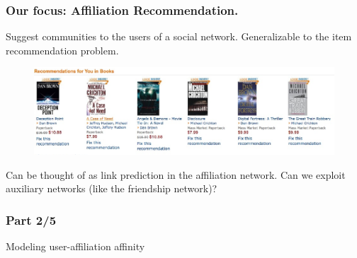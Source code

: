 \documentclass{beamer}
\begin{document}
\begin{frame}
\frametitle{Our focus: Affiliation Recommendation.}
\begin{itemize}
\pitem Suggest communities to the users of a social network.
\pitem Generalizable to the item recommendation problem.
\begin{figure}
\includegraphics[scale=0.25]{../talk/figures/amazonRecommendations.eps}
\end{figure}
\pitem Can be thought of as link prediction in the affiliation network.
\pitem Can we exploit auxiliary networks (like the friendship network)?
\end{itemize}
\end{frame}

\begin{frame}
\frametitle{Part 2/5}
  \hspace{1.1in}
  \centerline{\huge{Modeling user-affiliation affinity}}
\end{frame}
\end{document}

